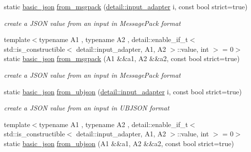 \begin{DoxyCompactItemize}
static \hyperlink{classnlohmann_1_1basic__json}{basic\+\_\+json} \hyperlink{classnlohmann_1_1basic__json_aab804530006701b136ef9a0bc961434b}{from\+\_\+msgpack} (\hyperlink{classnlohmann_1_1detail_1_1input__adapter}{detail\+::input\+\_\+adapter} i, const bool strict=true)
\begin{DoxyCompactList}\small\item\em create a J\+S\+ON value from an input in Message\+Pack format \end{DoxyCompactList}\item 
{\footnotesize template$<$typename A1 , typename A2 , detail\+::enable\+\_\+if\+\_\+t$<$ std\+::is\+\_\+constructible$<$ detail\+::input\+\_\+adapter, A1, A2 $>$\+::value, int $>$  = 0$>$ }\\static \hyperlink{classnlohmann_1_1basic__json}{basic\+\_\+json} \hyperlink{classnlohmann_1_1basic__json_ad435a9e5851197bb8e3d727faf10abc5}{from\+\_\+msgpack} (A1 \&\&a1, A2 \&\&a2, const bool strict=true)
\begin{DoxyCompactList}\small\item\em create a J\+S\+ON value from an input in Message\+Pack format \end{DoxyCompactList}\item 
static \hyperlink{classnlohmann_1_1basic__json}{basic\+\_\+json} \hyperlink{classnlohmann_1_1basic__json_afc590e292274a032cb0142d27778738e}{from\+\_\+ubjson} (\hyperlink{classnlohmann_1_1detail_1_1input__adapter}{detail\+::input\+\_\+adapter} i, const bool strict=true)
\begin{DoxyCompactList}\small\item\em create a J\+S\+ON value from an input in U\+B\+J\+S\+ON format \end{DoxyCompactList}\item 
{\footnotesize template$<$typename A1 , typename A2 , detail\+::enable\+\_\+if\+\_\+t$<$ std\+::is\+\_\+constructible$<$ detail\+::input\+\_\+adapter, A1, A2 $>$\+::value, int $>$  = 0$>$ }\\static \hyperlink{classnlohmann_1_1basic__json}{basic\+\_\+json} \hyperlink{classnlohmann_1_1basic__json_af0f553f2efd43198ee463ba207fe7f39}{from\+\_\+ubjson} (A1 \&\&a1, A2 \&\&a2, const bool strict=true)
\end{DoxyCompactItemize}

